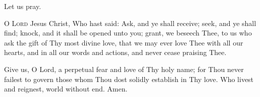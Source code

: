 
{\centering Let us pray.\par}

\lettrine{O}{ Lord} Jesus Christ, Who hast said: Ask, and ye shall receive; seek,
and ye shall find; knock, and it shall be opened unto you; grant, we
beseech Thee, to us who ask the gift of Thy most divine love, that we
may ever love Thee with all our hearts, and in all our words and
actions, and never cease praising Thee. 

Give us, O Lord, a perpetual
fear and love of Thy holy name; for Thou never failest to govern those
whom Thou dost solidly establish in Thy love. Who livest and reignest,
world without end.    
\Rbar Amen.
